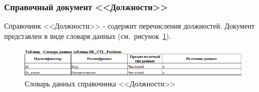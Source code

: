 



\subsubsection{Справочный документ <<Должности>>}

Справочник <<Должности>> - содержит перечисления должностей.
Документ представлен в виде словаря данных (см.~рисунок~\ref{fig:DE_CTL_Positions}).

\begin{figure}[!h]
    \centering
    \includegraphics[width=16cm]
    {assets/InformationalModel/DE_CTL_Positions.png}
    \caption{Словарь данных справочника <<Должности>>}
    \label{fig:DE_CTL_Positions}
\end{figure}


